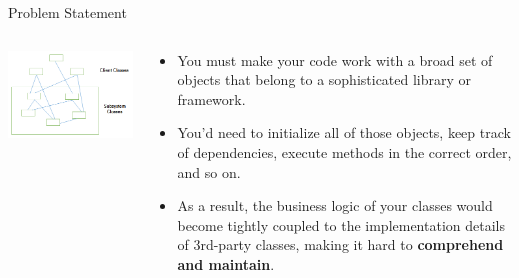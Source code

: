 \documentclass[13pt]{beamer}
\begin{document}
\begin{frame}{Problem Statement}
	\begin{columns}[T]
		\begin{column}{.5\textwidth}
			\includegraphics[scale=0.6]{./images/problem.jpg}
		\end{column}
	
		\begin{column}{.5\textwidth}
			\begin{itemize}
				\item You must make your code work with a broad set of objects that belong to a sophisticated library or framework.
				\item You’d need to initialize all of those objects, keep track of dependencies, execute methods in the correct order, and so on.
				\item As a result, the business logic of your classes would become tightly coupled to the implementation details of 3rd-party classes, making it hard to \textbf{comprehend and maintain}.
			\end{itemize}
		\end{column}
	\end{columns}
\end{frame}
\end{document}
